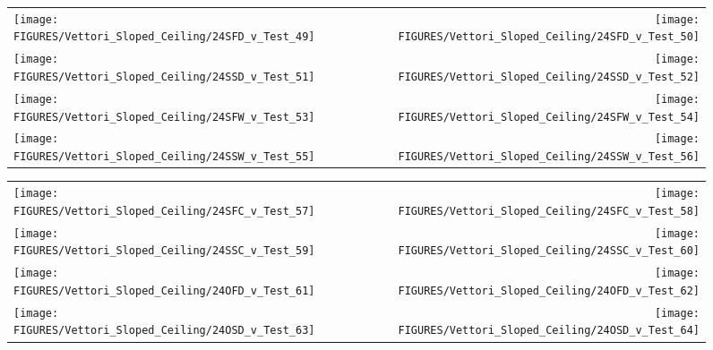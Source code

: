 \begin{figure}[p]
\begin{tabular*}{\textwidth}{l@{\extracolsep{\fill}}r}
\texttt{[image: FIGURES/Vettori\_Sloped\_Ceiling/24SFD\_v\_Test\_49]} &
\texttt{[image: FIGURES/Vettori\_Sloped\_Ceiling/24SFD\_v\_Test\_50]} \\
\texttt{[image: FIGURES/Vettori\_Sloped\_Ceiling/24SSD\_v\_Test\_51]} &
\texttt{[image: FIGURES/Vettori\_Sloped\_Ceiling/24SSD\_v\_Test\_52]} \\
\texttt{[image: FIGURES/Vettori\_Sloped\_Ceiling/24SFW\_v\_Test\_53]} &
\texttt{[image: FIGURES/Vettori\_Sloped\_Ceiling/24SFW\_v\_Test\_54]} \\
\texttt{[image: FIGURES/Vettori\_Sloped\_Ceiling/24SSW\_v\_Test\_55]} &
\texttt{[image: FIGURES/Vettori\_Sloped\_Ceiling/24SSW\_v\_Test\_56]} \\
\end{tabular*}
\label{Vettori_Sloped_7}
\end{figure}

\begin{figure}[p]
\begin{tabular*}{\textwidth}{l@{\extracolsep{\fill}}r}
\texttt{[image: FIGURES/Vettori\_Sloped\_Ceiling/24SFC\_v\_Test\_57]} &
\texttt{[image: FIGURES/Vettori\_Sloped\_Ceiling/24SFC\_v\_Test\_58]} \\
\texttt{[image: FIGURES/Vettori\_Sloped\_Ceiling/24SSC\_v\_Test\_59]} &
\texttt{[image: FIGURES/Vettori\_Sloped\_Ceiling/24SSC\_v\_Test\_60]} \\
\texttt{[image: FIGURES/Vettori\_Sloped\_Ceiling/24OFD\_v\_Test\_61]} &
\texttt{[image: FIGURES/Vettori\_Sloped\_Ceiling/24OFD\_v\_Test\_62]} \\
\texttt{[image: FIGURES/Vettori\_Sloped\_Ceiling/24OSD\_v\_Test\_63]} &
\texttt{[image: FIGURES/Vettori\_Sloped\_Ceiling/24OSD\_v\_Test\_64]} \\
\end{tabular*}
\label{Vettori_Sloped_8}
\end{figure}


